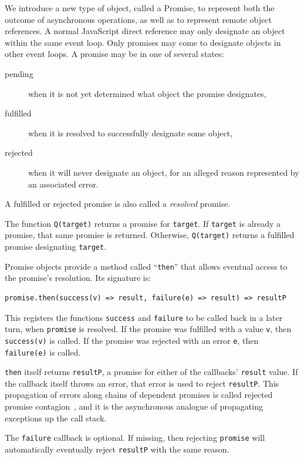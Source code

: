 \documentclass{llncs}
\begin{document}
We introduce a new type of object, called a Promise, to represent both the outcome of asynchronous operations, as well as to represent remote object references. A normal JavaScript direct reference may only designate an object within the same event loop. Only promises may come to designate objects in other event loops. A promise may be in one of several states:

\begin{description}
  \item[pending] when it is not yet determined what object the promise designates,
  \item[fulfilled] when it is resolved to successfully designate some object,
  \item[rejected] when it will never designate an object, for an alleged reason represented by an associated error.
\end{description}

A fulfilled or rejected promise is also called a \emph{resolved} promise.

The function {\tt Q(target)} returns a promise for {\tt target}. If {\tt target} is already a promise, that same promise is returned. Otherwise, {\tt Q(target)} returns a fulfilled promise designating {\tt target}.

Promise objects provide a method called ``{\tt then}'' that allows eventual access to the promise's resolution. Its signature is:

\begin{verbatim}
promise.then(success(v) => result, failure(e) => result) => resultP
\end{verbatim}

This registers the functions {\tt success} and {\tt failure} to be called back in a later turn, when {\tt promise} is resolved. If the promise was fulfilled with a value {\tt v}, then {\tt success(v)} is called. If the promise was rejected with an error {\tt e}, then {\tt failure(e)} is called.

{\tt then} itself returns {\tt resultP}, a promise for either of the callbacks' {\tt result} value. If the callback itself throws an error, that error is used to reject {\tt resultP}. This propagation of errors along chains of dependent promises is called rejected promise contagion~\cite{miller:strangers}, and it is the asynchronous analogue of propagating exceptions up the call stack.

The {\tt failure} callback is optional. If missing, then rejecting {\tt promise} will automatically eventually reject {\tt resultP} with the same reason.
\end{document}
